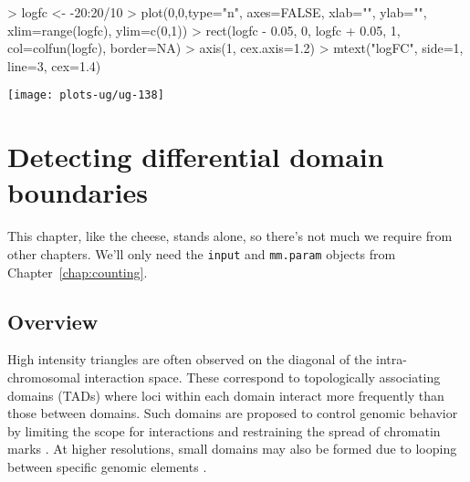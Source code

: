 \documentclass[12pt]{report}
\renewenvironment{Schunk}{\vspace{0pt}}{\vspace{0pt}}
\newcommand{\code}[1]{{\small\texttt{#1}}}
\newenvironment{combox}
{ \begin{shaded}\begin{center}\begin{minipage}[t]{0.95\textwidth} }
{ \end{minipage}\end{center}\end{shaded} }
\begin{document}
\begin{Schunk}
\begin{Sinput}
> logfc <- -20:20/10
> plot(0,0,type="n", axes=FALSE, xlab="", ylab="", xlim=range(logfc), ylim=c(0,1))
> rect(logfc - 0.05, 0, logfc + 0.05, 1, col=colfun(logfc), border=NA)
> axis(1, cex.axis=1.2)
> mtext("logFC", side=1, line=3, cex=1.4)
\end{Sinput}
\end{Schunk}

\begin{center}
\texttt{[image: plots-ug/ug-138]}
\end{center}


\chapter{Detecting differential domain boundaries}
\label{chap:domains}
\begin{combox}
This chapter, like the cheese, stands alone, so there's not much we require from other chapters.
We'll only need the \code{input} and \code{mm.param} objects from Chapter~\ref{chap:counting}.
\end{combox}

\section{Overview}
High intensity triangles are often observed on the diagonal of the intra-chromosomal interaction space.
These correspond to topologically associating domains (TADs) where loci within each domain interact more frequently than those between domains.
Such domains are proposed to control genomic behavior by limiting the scope for interactions and restraining the spread of chromatin marks \citep{nora2013segmental}.
At higher resolutions, small domains may also be formed due to looping between specific genomic elements \citep{rao2014kilobase}.
\end{document}
